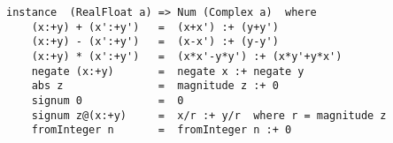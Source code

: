 \begin{verbatim}
instance  (RealFloat a) => Num (Complex a)  where
    (x:+y) + (x':+y')   =  (x+x') :+ (y+y')
    (x:+y) - (x':+y')   =  (x-x') :+ (y-y')
    (x:+y) * (x':+y')   =  (x*x'-y*y') :+ (x*y'+y*x')
    negate (x:+y)       =  negate x :+ negate y
    abs z               =  magnitude z :+ 0
    signum 0            =  0
    signum z@(x:+y)     =  x/r :+ y/r  where r = magnitude z
    fromInteger n       =  fromInteger n :+ 0
\end{verbatim}